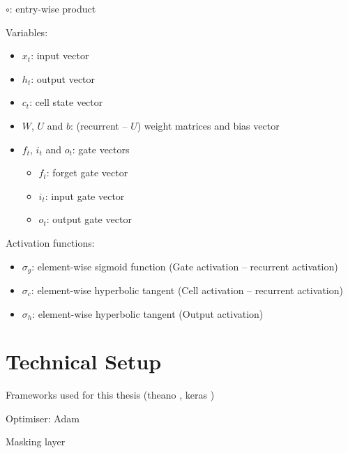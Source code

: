 $\circ$: entry-wise product


Variables:
\begin{itemize}
\item $x_t$: input vector
\item $h_t$: output vector
\item $c_t$: cell state vector
\item $W$, $U$ and $b$: (recurrent -- $U$) weight matrices and bias vector
\item $f_t$, $i_t$ and $o_t$: gate vectors
  \begin{itemize}
  \item $f_t$: forget gate vector
  \item $i_t$: input gate vector
  \item $o_t$: output gate vector
  \end{itemize}
\end{itemize}

Activation functions:
\begin{itemize}
\item $\sigma_g$: element-wise sigmoid function (Gate activation -- recurrent
  activation)
\item $\sigma_c$: element-wise hyperbolic tangent (Cell activation -- recurrent
  activation)
\item $\sigma_h$: element-wise hyperbolic tangent (Output activation)
\end{itemize}


\section{Technical Setup}
\label{sec:tech_setup}

Frameworks used for this thesis (theano \cite{theano}, keras \cite{keras})

Optimiser: Adam

Masking layer


